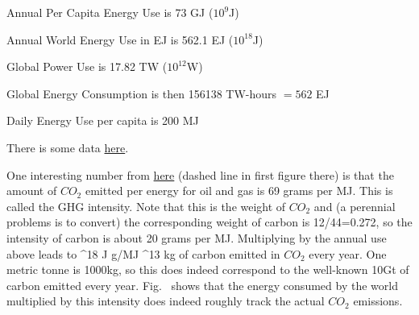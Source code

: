 \documentclass[11pt]{book}
\begin{document}

\bei
\item Annual Per Capita Energy Use is 73 GJ ($10^9$J)
\item
Annual World Energy Use in EJ is 562.1 EJ ($10^{18}$J)
\item
Global Power Use is 17.82 TW ($10^{12}$W)
\item 
Global Energy Consumption is then 156138 TW-hours $=562$ EJ
\item
Daily Energy Use per capita is 200 MJ
\eei

There is some data \href{https://github.com/owid/co2-data}{here}.

One interesting number from \href{https://www.science.org/doi/10.1126/science.abh0687}{here} (dashed line in first figure there) is that the amount of $CO_2$ emitted per energy for oil and gas is 69 grams per MJ. This is called the GHG intensity. Note that this is the weight of $CO_2$ and (a perennial problems is to convert) the corresponding weight of carbon is 12/44=0.272, so the intensity of carbon is about 20 grams per MJ. Multiplying by the annual use above leads to 
^{18} J  g/MJ ^{13} kg
\ee
of carbon emitted in $CO_2$ every year. One metric tonne is 1000kg, so this does indeed correspond to the well-known 10Gt of carbon emitted every year.
Fig.~ shows that the energy consumed by the world multiplied by this intensity does indeed roughly track the actual $CO_2$ emissions.
\end{document}
